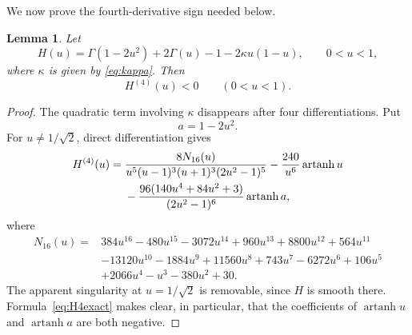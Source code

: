 \documentclass[11pt]{article}
\newtheorem{lemma}[theorem]{Lemma}
\theoremstyle{definition}
\theoremstyle{remark}
\newcommand{\artanh}{\operatorname{artanh}}
\begin{document}
We now prove the fourth-derivative sign needed below.

\begin{lemma}
\label{lem:H4}
Let
\begin{equation}
\label{eq:Hdef}
H(u)
=
\Gamma(1-2u^2)+2\Gamma(u)-1-2\kappa u(1-u),
\qquad 0<u<1,
\end{equation}
where $\kappa$ is given by \eqref{eq:kappa}.  Then
\begin{equation}
\label{eq:H4neg}
H^{(4)}(u)<0
\qquad(0<u<1).
\end{equation}
\end{lemma}

\begin{proof}
The quadratic term involving $\kappa$ disappears after four differentiations.  Put
\[
a=1-2u^2.
\]
For $u\ne1/\sqrt2$, direct differentiation gives
\begin{align}
H^{(4)}(u)={}&
\frac{8N_{16}(u)}
{u^5(u-1)^3(u+1)^3(2u^2-1)^5}
-\frac{240}{u^6}\artanh u \notag\\
&-\frac{96(140u^4+84u^2+3)}{(2u^2-1)^6}\artanh a,
\label{eq:H4exact}
\end{align}
where
\begin{align*}
N_{16}(u)={}&384u^{16}-480u^{15}-3072u^{14}+960u^{13}+8800u^{12}
+564u^{11}\\
&-13120u^{10}-1884u^9+11560u^8+743u^7-6272u^6+106u^5\\
&+2066u^4-u^3-380u^2+30.
\end{align*}
The apparent singularity at $u=1/\sqrt2$ is removable, since $H$ is smooth there.  Formula~\eqref{eq:H4exact} makes clear, in particular, that the coefficients of $\artanh u$ and $\artanh a$ are both negative.


\end{proof}
\end{document}
